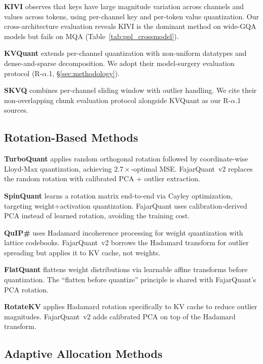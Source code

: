 \documentclass[10pt,twocolumn]{article}
\begin{document}
\textbf{KIVI} \citep{liu2024kivi} observes that keys have large
magnitude variation across channels and values across tokens, using
per-channel key and per-token value quantization. Our cross-architecture
evaluation reveals KIVI is the dominant method on wide-GQA models but
fails on MQA (Table~\ref{tab:ppl_crossmodel}).

\textbf{KVQuant} \citep{hooper2024kvquant} extends per-channel
quantization with non-uniform datatypes and dense-and-sparse
decomposition. We adopt their model-surgery evaluation protocol
(R-$\alpha$.1, \S\ref{sec:methodology}).

\textbf{SKVQ} \citep{duanmu2024skvq} combines per-channel sliding
window with outlier handling. We cite their non-overlapping chunk
evaluation protocol alongside KVQuant as our R-$\alpha$.1 sources.

\subsection{Rotation-Based Methods}

\textbf{TurboQuant} \citep{zandieh2025turboquant} applies random
orthogonal rotation followed by coordinate-wise Lloyd-Max quantization,
achieving $2.7\times$-optimal MSE. FajarQuant~v2 replaces the random
rotation with calibrated PCA + outlier extraction.

\textbf{SpinQuant} \citep{liu2024spinquant} learns a rotation matrix
end-to-end via Cayley optimization, targeting weight+activation
quantization. FajarQuant uses calibration-derived PCA instead of learned
rotation, avoiding the training cost.

\textbf{QuIP\#} \citep{tseng2024quip} uses Hadamard incoherence
processing for weight quantization with lattice codebooks. FajarQuant~v2
borrows the Hadamard transform for outlier spreading but applies it to
KV cache, not weights.

\textbf{FlatQuant} \citep{sun2024flatquant} flattens weight
distributions via learnable affine transforms before quantization. The
``flatten before quantize'' principle is shared with FajarQuant's PCA
rotation.

\textbf{RotateKV} \citep{wang2024rotatekv} applies Hadamard rotation
specifically to KV cache to reduce outlier magnitudes. FajarQuant~v2
adds calibrated PCA on top of the Hadamard transform.

\subsection{Adaptive Allocation Methods}
\end{document}
